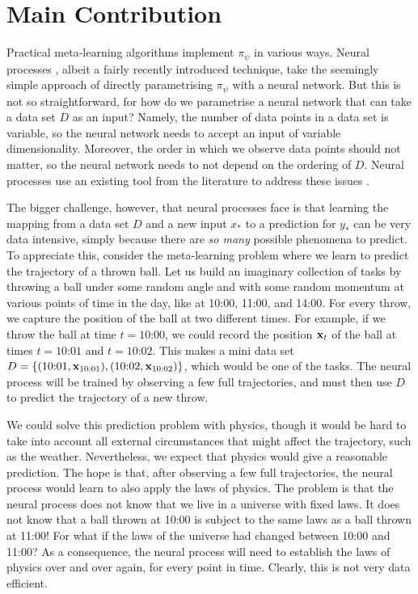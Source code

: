 \documentclass[12pt, twoside]{report}
\begin{document}
\section{Main Contribution}
\label{sec:introduction:main_contribution}
Practical meta-learning algorithms implement $\pi_\psi$ in various ways.
Neural processes \parencite[NPs;][]{Garnelo:2018:Conditional_Neural_Processes,Garnelo:2018:Neural_Processes}, albeit a fairly recently introduced technique, take the seemingly simple approach of directly parametrising $\pi_\psi$ with a neural network.
But this is not so straightforward, for
how do we parametrise a neural network that can take a data set $D$ as an input?
Namely, the number of data points in a data set is variable, so the neural network needs to accept an input of variable dimensionality.
Moreover, the order in which we observe data points should not matter, so the neural network needs to not depend on the ordering of $D$.
Neural processes use an existing tool from the literature to address these issues \parencite{Zaheer:2017:Deep_Sets,Edwards:2017:Towards_a_Neural_Statistician}.


The bigger challenge, however, that neural processes face is that learning the mapping from a data set $D$ and a new input $x_*$ to a prediction for $y_*$ can be very data intensive, simply because there are \emph{so many} possible phenomena to predict.
To appreciate this, consider the meta-learning problem where we learn to predict the trajectory of a thrown ball.
Let us build an imaginary collection of tasks by 
throwing a ball under some random angle and with some random momentum
at various points of time in the day, like at 10:00, 11:00, and 14:00.
For every throw, we capture the position of the ball at two different times.
For example, if we throw the ball at time $t=\text{10:00}$, we could record the position $\mathbf{x}_t$ of the ball at times $t=\text{10:01}$ and $t=\text{10:02}$.
This makes a mini data set $D=\{(\text{10:01}, \mathbf{x}_\text{10:01}), (\text{10:02}, \mathbf{x}_\text{10:02})\}$, which would be one of the tasks.
The neural process will be trained by observing a few full trajectories, and must then use $D$ to predict the trajectory of a new throw.

We could solve this prediction problem with physics, though it would be hard to take into account all external circumstances that might affect the trajectory, such as the weather.
Nevertheless, we expect that physics would give a reasonable prediction.
The hope is that, after observing a few full trajectories, the neural process would learn to also apply the laws of physics.
The problem is that the neural process does not know that we live in a universe with fixed laws.
It does not know that a ball thrown at 10:00 is subject to the same laws as a ball thrown at 11:00!
For what if the laws of the universe had changed between 10:00 and 11:00?
As a consequence, the neural process will need to establish the laws of physics over and over again, for every point in time.
Clearly, this is not very data efficient.
\end{document}
